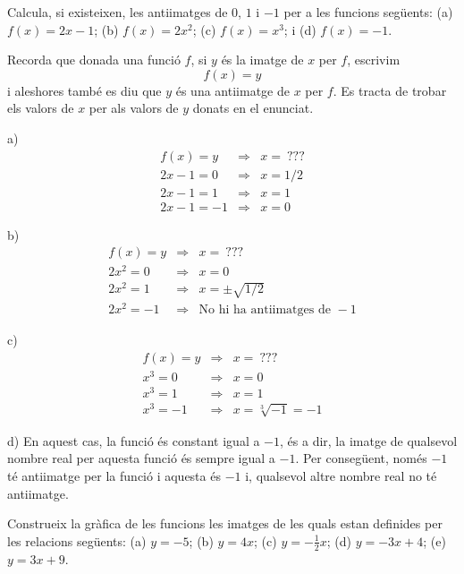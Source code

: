 \begin{exercici}
Calcula, si existeixen, les antiimatges de $0$, $1$ i $-1$ per a les
funcions següents: (a) $f(x)=2x-1$; (b) $f(x)=2x^{2}$; (c) $f(x)=x^{3}$;
i (d) $f(x)=-1$.
\end{exercici}

\begin{solucio}
Recorda que donada una funció $f$, si $y$ és la imatge de $x$ per $f$,
escrivim\[
f(x)=y
\]i aleshores també es diu que $y$ és una antiimatge de $x$ per $f$. Es
tracta de trobar els valors de $x$ per als valors de $y$ donats en el
enunciat.

a)
\[
\begin{array}{lll}
f(x)=y & \Longrightarrow & x=~??? \\
2x-1=0 & \Longrightarrow & x=1/2 \\
2x-1=1 & \Longrightarrow & x=1 \\
2x-1=-1 & \Longrightarrow & x=0\end{array}\]

b)\[
\begin{array}{lll}
f(x)=y & \Longrightarrow & x=~??? \\
2x^{2}=0 & \Longrightarrow & x=0 \\
2x^{2}=1 & \Longrightarrow & x=\pm \sqrt{1/2} \\
2x^{2}=-1 & \Longrightarrow & \text{No hi ha antiimatges de }-1\end{array}\]

c)\[
\begin{array}{lll}
f(x)=y & \Longrightarrow & x=~??? \\
x^{3}=0 & \Longrightarrow & x=0 \\
x^{3}=1 & \Longrightarrow & x=1 \\
x^{3}=-1 & \Longrightarrow & x=\sqrt[3]{-1}=-1\end{array}\]

d) En aquest cas, la funció és constant igual a $-1$, és a dir, la
imatge de qualsevol nombre real per aquesta funció és sempre igual a $-1$. Per consegüent, només $-1$ té antiimatge per la funció i
aquesta és $-1$ i, qualsevol altre nombre real no té antiimatge.
\end{solucio}

\begin{exercici}
Construeix la gràfica de les funcions les imatges de les quals estan
definides per les relacions següents: (a) $y=-5$; (b) $y=4x$; (c) $y=-\frac{1}{2}x$; (d) $y=-3x+4$; (e) $y=3x+9$.
\end{exercici}

